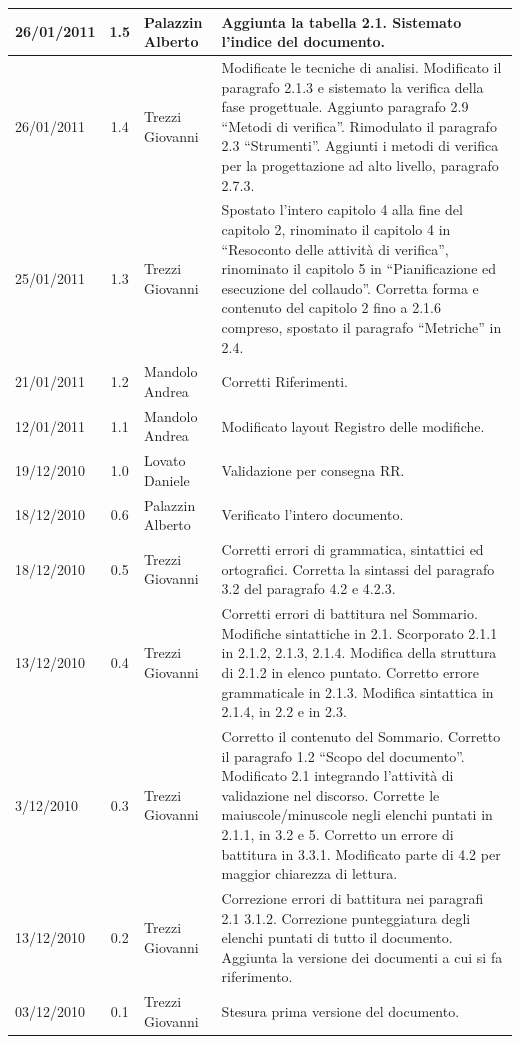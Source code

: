 \begin{longtable}{|p{}|c|p{}|p{}|}
\hline
26/01/2011 & 1.5 & Palazzin Alberto & Aggiunta la tabella 2.1. Sistemato
l'indice del documento.\\
\hline
26/01/2011 & 1.4 & Trezzi Giovanni & Modificate le tecniche di analisi.
Modificato il paragrafo 2.1.3 e sistemato la verifica della fase progettuale.
Aggiunto paragrafo 2.9 ``Metodi di verifica''. Rimodulato il paragrafo 2.3
``Strumenti''. Aggiunti i metodi di verifica per la progettazione ad alto
livello, paragrafo 2.7.3.\\
\hline
25/01/2011 & 1.3 & Trezzi Giovanni & Spostato l'intero capitolo 4 alla fine
del capitolo 2, rinominato il capitolo 4 in ``Resoconto delle attivit\`a di
verifica'', rinominato il capitolo 5 in ``Pianificazione ed esecuzione del
collaudo''. Corretta forma e contenuto del capitolo 2 fino a 2.1.6 compreso,
spostato il paragrafo ``Metriche'' in 2.4.  
\\
\hline
21/01/2011 & 1.2 & Mandolo Andrea & Corretti Riferimenti.\\
\hline
12/01/2011 & 1.1 & Mandolo Andrea & Modificato layout Registro delle
modifiche.\\
\hline
19/12/2010 & 1.0 & Lovato Daniele & Validazione per consegna RR.\\
\hline
18/12/2010 & 0.6 & Palazzin Alberto & Verificato l'intero documento.\\
\hline
18/12/2010 & 0.5 & Trezzi Giovanni & Corretti errori di grammatica, sintattici
ed ortografici. Corretta la sintassi del paragrafo 3.2 del paragrafo 4.2 e
4.2.3.\\
\hline
13/12/2010 & 0.4 & Trezzi Giovanni & Corretti errori di battitura nel Sommario.
Modifiche sintattiche in 2.1. Scorporato 2.1.1 in 2.1.2, 2.1.3, 2.1.4. Modifica della
struttura di 2.1.2 in elenco puntato. Corretto errore grammaticale in 2.1.3.
Modifica sintattica in 2.1.4, in 2.2 e in 2.3.\\
\hline
3/12/2010 & 0.3 & Trezzi Giovanni & Corretto il contenuto del Sommario. Corretto
il paragrafo 1.2 ``Scopo del documento''. Modificato 2.1 integrando l'attivit\`a
di validazione nel discorso. Corrette le maiuscole/minuscole negli elenchi
puntati in 2.1.1, in 3.2 e 5. Corretto un errore di battitura in 3.3.1.
Modificato parte di 4.2 per maggior chiarezza di lettura.\\
\hline
13/12/2010 & 0.2 & Trezzi Giovanni & Correzione errori di battitura nei
paragrafi 2.1 3.1.2. Correzione punteggiatura degli elenchi puntati di tutto il documento.
Aggiunta la versione dei documenti a cui si fa riferimento.\\
\hline
03/12/2010 & 0.1 & Trezzi Giovanni & Stesura prima versione del documento.\\
\end{longtable}


